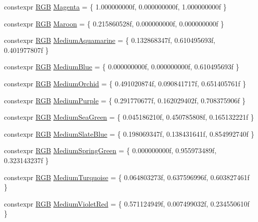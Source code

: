 \begin{DoxyCompactItemize}
\item 
constexpr \hyperlink{structmage_1_1_r_g_b}{R\+GB} \hyperlink{namespacemage_1_1color_ace3bc5380195732597310bea2764a6bd}{Magenta} = \{ 1.\+000000000f, 0.\+000000000f, 1.\+000000000f \}
\item 
constexpr \hyperlink{structmage_1_1_r_g_b}{R\+GB} \hyperlink{namespacemage_1_1color_a6573b86c7e6c8c7cbf76c108a5820259}{Maroon} = \{ 0.\+215860528f, 0.\+000000000f, 0.\+000000000f \}
\item 
constexpr \hyperlink{structmage_1_1_r_g_b}{R\+GB} \hyperlink{namespacemage_1_1color_a4560188b77c7b4a82162c749b9e4e5f6}{Medium\+Aquamarine} = \{ 0.\+132868347f, 0.\+610495693f, 0.\+401977807f \}
\item 
constexpr \hyperlink{structmage_1_1_r_g_b}{R\+GB} \hyperlink{namespacemage_1_1color_a0be5a1c37d2e0598414235399e0cb6e2}{Medium\+Blue} = \{ 0.\+000000000f, 0.\+000000000f, 0.\+610495693f \}
\item 
constexpr \hyperlink{structmage_1_1_r_g_b}{R\+GB} \hyperlink{namespacemage_1_1color_a55306d3a39ad61219538ba4527521342}{Medium\+Orchid} = \{ 0.\+491020874f, 0.\+090841717f, 0.\+651405761f \}
\item 
constexpr \hyperlink{structmage_1_1_r_g_b}{R\+GB} \hyperlink{namespacemage_1_1color_a05a317af5ced870161013504175e18b8}{Medium\+Purple} = \{ 0.\+291770677f, 0.\+162029402f, 0.\+708375906f \}
\item 
constexpr \hyperlink{structmage_1_1_r_g_b}{R\+GB} \hyperlink{namespacemage_1_1color_a28991b5b9e22fa71e7554d315741da6c}{Medium\+Sea\+Green} = \{ 0.\+045186210f, 0.\+450785808f, 0.\+165132221f \}
\item 
constexpr \hyperlink{structmage_1_1_r_g_b}{R\+GB} \hyperlink{namespacemage_1_1color_ac985e8c0e60c1a407ebb8190318e5f26}{Medium\+Slate\+Blue} = \{ 0.\+198069347f, 0.\+138431641f, 0.\+854992740f \}
\item 
constexpr \hyperlink{structmage_1_1_r_g_b}{R\+GB} \hyperlink{namespacemage_1_1color_ad301b4945f333081cdfe7e49e7db2bd3}{Medium\+Spring\+Green} = \{ 0.\+000000000f, 0.\+955973489f, 0.\+323143237f \}
\item 
constexpr \hyperlink{structmage_1_1_r_g_b}{R\+GB} \hyperlink{namespacemage_1_1color_addbe783ed9989a03f0a3033e47f4f7dc}{Medium\+Turquoise} = \{ 0.\+064803273f, 0.\+637596996f, 0.\+603827461f \}
\item 
constexpr \hyperlink{structmage_1_1_r_g_b}{R\+GB} \hyperlink{namespacemage_1_1color_aa122b0bf6b5374aaf7d77f1d4e9095ae}{Medium\+Violet\+Red} = \{ 0.\+571124949f, 0.\+007499032f, 0.\+234550610f \}

\end{DoxyCompactItemize}
